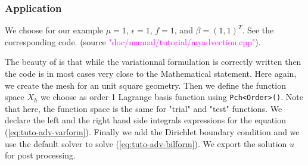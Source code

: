 \subsubsection{Application}

We choose for our example $\mu = 1$, $\epsilon = 1$, $f=1$, and
$\beta=(1,1)^T$.
See the corresponding code. 
(source \textcolor{magenta}{"doc/manual/tutorial/myadvection.cpp"}).
%
\vspace{2mm}

\vspace{2mm}
%
The beauty of \feel is that while the variationnal formulation is correctly written
then the code is in most cases very close to the Mathematical statement.
Here again, we create the mesh for an unit square geometry. Then we define the function
space $X_h$ we choose as order 1 Lagrange basis function using \lstinline!Pch<Order>()!.
Note that here, the function space is the same for "trial" and "test" functions.
We declare the left and the right hand side integrals expressions for the equation
(\ref{eq:tuto-adv-varform}). Finally we add the Dirichlet boundary condition and we use
the default solver to solve (\ref{eq:tuto-adv-bilform}).
We export the solution $u$ for post processing.



